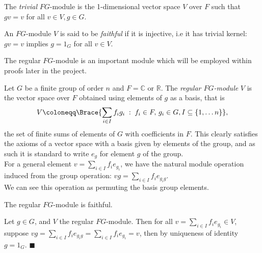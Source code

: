 \documentclass[../Project.tex]{subfiles}
\begin{document}
\begin{defi}
	The \textit{trivial} $FG$-module is the 1-dimensional vector space $V$ over $F$ such that
	$gv = v$ for all $v \in V, g \in G$.
\end{defi}

\begin{defi}
	An $FG$-module $V$ is said to be \textit{faithful} if it is injective, i.e it has trivial kernel: $gv = v$ implies $g = 1_G$ for all $v \in V$.\\
\end{defi}

The regular $FG$-module is an important module which will be employed within proofs later in the project.

\begin{defi}
	Let $G$ be a finite group of order $n$ and $F = \mathbb{C}$ or $\mathbb{R}$. The \textit{regular $FG$-module} $V$ is the vector space over $F$ obtained using elements of $g$ as a basis, that is 
	$$V \coloneqq \Brace{\sum_{i \in I}f_ig_i \;:\; f_i \in F,\,g_i \in G, I \subseteq \{1,\dots n\}},$$
	the set of finite sums of elements of $G$ with coefficients in $F$. This clearly satisfies the axioms of a vector space with a basis given by elements of the group, and as such it is standard to write $e_g$ for element $g$ of the group.\\

	For a general element $v = \sum\limits_{i \in I}f_ie_{g_i}$, we have the natural module operation induced from the group operation: $vg = \sum\limits_{i \in I}f_ie_{g_ig}$.\\

	We can see this operation as permuting the basis group elements.
\end{defi}

\begin{prop}[{\cite[Proposition 6.6]{2}}]
	The regular ${F}G$-module is faithful.
\end{prop}
\begin{proo*}[{\cite[Proposition 6.6]{2}}]
	Let $g \in G$, and $V$ the regular $FG$-module. Then for all $v = \sum\limits_{i \in I}f_ie_{{g_i}} \in V$, suppose $vg = \sum\limits_{i \in I}f_ie_{g_ig} = \sum\limits_{i \in I}f_ie_{g_i}  = v$, then by uniqueness of identity $g = 1_G$. \hfill$\blacksquare$\\
\end{proo*}
\end{document}
